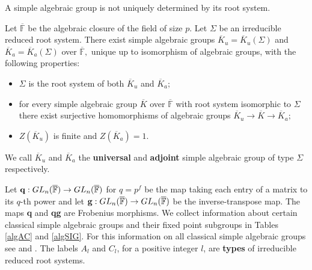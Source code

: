 
A simple algebraic group is not  uniquely determined by its root system.
\begin{Th}
Let $\overline{\mathbb{F}}$ be the algebraic closure of the field of size $p.$ Let $\Sigma$ be an irreducible reduced root system. There exist simple algebraic groups $\overline{K}_u=\overline{K}_u(\Sigma)$ and $\overline{K}_a=\overline{K}_a(\Sigma)$ over $\overline{\mathbb{F}},$ unique up to isomorphism of algebraic groups, with the following properties:
\begin{itemize}
\item $\Sigma$ is the root system of both $\overline{K}_u$ and $\overline{K}_a;$
\item for every simple algebraic group $\overline{K}$ over $\overline{\mathbb{F}}$ with root system isomorphic to $\Sigma$ there exist  surjective homomorphisms of algebraic groups   $\overline{K}_u \to \overline{K}\to \overline{K}_a;$
\item $Z(\overline{K}_u)$ is finite and $Z(\overline{K}_a)=1.$
\end{itemize} 
\end{Th}
We call $\overline{K}_u$ and $\overline{K}_a$ the {\bf universal}  and {\bf adjoint}  simple algebraic group of type $\Sigma$ respectively.

Let ${\bf q}:GL_n(\overline{\mathbb{F}}) \to GL_n(\overline{\mathbb{F}})$ for $q=p^f$ be the map taking each entry of a  matrix to its $q$-th power and let ${\bf g}:GL_n(\overline{\mathbb{F}}) \to GL_n(\overline{\mathbb{F}})$ be the inverse-transpose map. The maps {\bf q} and {\bf qg} are Frobenius morphisms. We collect information about certain classical simple algebraic groups and their fixed point subgroups in Tables \ref{algAC} and \ref{algSIG}. For this information on all classical simple algebraic groups see \cite[Theorem 1.10.7]{gorlyo} and \cite[\S 1.19]{carter}. The labels  $A_l$ and $C_l$, for a positive integer $l$, are {\bf types} of irreducible reduced root systems. 


